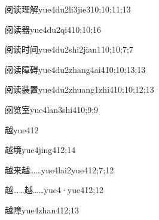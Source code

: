 \begin{verbete}{阅读理解}{yue4du2li3jie3}{10;10;11;13}
\end{verbete}

\begin{verbete}{阅读器}{yue4du2qi4}{10;10;16}
\end{verbete}

\begin{verbete}{阅读时间}{yue4du2shi2jian1}{10;10;7;7}
\end{verbete}

\begin{verbete}{阅读障碍}{yue4du2zhang4ai4}{10;10;13;13}
\end{verbete}

\begin{verbete}{阅读装置}{yue4du2zhuang1zhi4}{10;10;12;13}
\end{verbete}

\begin{verbete}{阅览室}{yue4lan3shi4}{10;9;9}
\end{verbete}

\begin{verbete}{越}{yue4}{12}
\end{verbete}

\begin{verbete}{越境}{yue4jing4}{12;14}
\end{verbete}

\begin{verbete}{越来越……}{yue4lai2yue4}{12;7;12}
\end{verbete}

\begin{verbete}{越……越……}{yue4·yue4}{12;12}
\end{verbete}

\begin{verbete}{越障}{yue4zhan4}{12;13}
\end{verbete}

